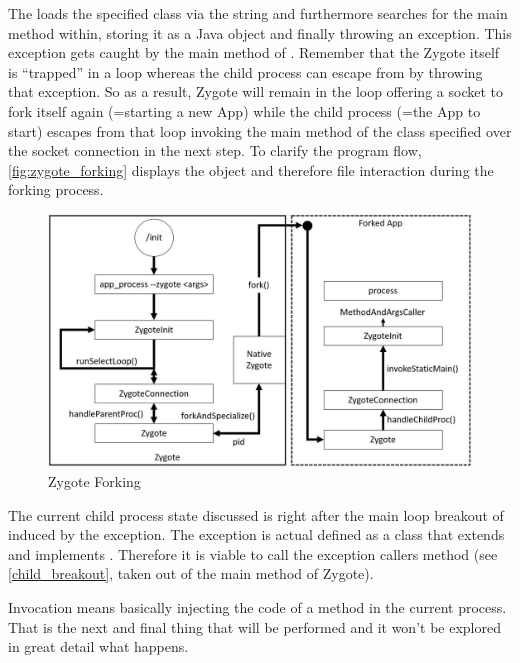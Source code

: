 The  loads the specified class via the  string and furthermore searches for the main method within, storing it as a Java  object and finally throwing an
 exception. This exception gets caught by the main method of .
Remember that the Zygote itself is ``trapped'' in a loop whereas the child process can escape from by throwing that exception. So as a result, Zygote will remain in the loop offering a socket to fork itself again (=starting a new App) while the child process (=the App to start) escapes from that loop invoking the main method of the class specified over the socket
connection in the next step.
To clarify the program flow, \autoref{fig:zygote_forking} displays
the object and therefore file interaction during the forking process.

\begin{figure}[htb]
  \centering
  \includegraphics[width={\textwidth}]{figures/zygote_forking}
  \caption[Zygote Forking]{Zygote Forking}
  \label{fig:zygote_forking}
\end{figure}


The current child process state discussed is right after the main loop
breakout of  induced by the exception. The exception
is actual defined as a class that extends  and implements
. Therefore it is viable to call the exception callers
 method (see \autoref{child_breakout}, taken out of the main
method of Zygote).



Invocation means basically injecting the code of a method in the current process. That is the next and final thing that will be performed and it won't
be explored in great detail what happens.

